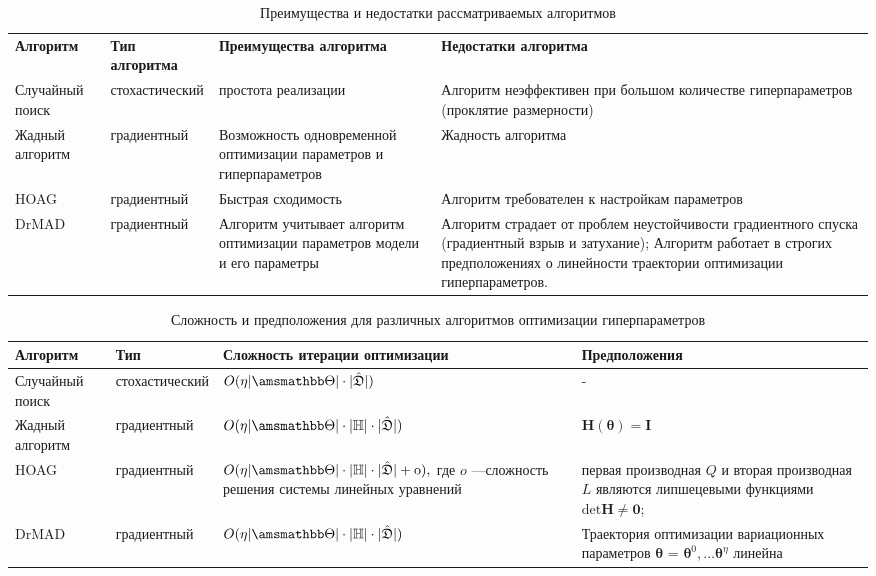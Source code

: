 \begin{table}[H]
\small

\begin{tabularx}{\textwidth}{|X|X|X|X|}
\hline
\bf Алгоритм & \bf Тип алгоритма & \bf Преимущества алгоритма & \bf Недостатки алгоритма  \\ 
Случайный поиск & стохастический & простота реализации& Алгоритм неэффективен при большом количестве гиперпараметров (проклятие размерности)  \\ \hline
Жадный алгоритм~\cite{greed_hyper} & градиентный & Возможность одновременной оптимизации параметров и гиперпараметров & Жадность алгоритма \\ \hline
HOAG~\cite{hyper_hoag} & градиентный & Быстрая сходимость & Алгоритм требователен к настройкам параметров \\ \hline 
DrMAD~\cite{hyper_mad} & градиентный & Алгоритм учитывает алгоритм оптимизации параметров модели и его параметры & Алгоритм страдает от проблем неустойчивости градиентного спуска (градиентный взрыв и затухание); Алгоритм работает в строгих предположениях о линейности траектории оптимизации гиперпараметров.\\ \hline
\end{tabularx}

\caption{Преимущества и недостатки рассматриваемых алгоритмов}
\label{table:algo_descr}

\end{table}


\begin{table}[H]
\small

\begin{tabularx}{\textwidth}{|X|X|X|X|}
\hline
\bf Алгоритм & \bf Тип & \bf Сложность итерации оптимизации & \bf Предположения \\ 
\hline
Случайный поиск & стохастический & $O(\eta |\Tetab|\cdot |\hat{\mathfrak{D}}|)$& -  \\ \hline
Жадный алгоритм~\cite{greed_hyper} & градиентный & $O(\eta |\Tetab|\cdot|\Hb|\cdot |\hat{\mathfrak{D}}|)$ & $\mathbf{H}(\boldsymbol{\theta}) = \mathbf{I}$  \\ \hline
HOAG~\cite{hyper_hoag} & градиентный & $O(\eta |\Tetab|\cdot|\Hb| \cdot |\hat{\mathfrak{D}}| + \text{o}),$ где $o$ ---сложность решения системы линейных уравнений& первая производная $Q$  и вторая производная $L$  являются липшецевыми функциями  $\text{det}\mathbf{H} \neq \mathbf{0}$;  \\ \hline
DrMAD~\cite{hyper_mad} & градиентный &$O(\eta |\Tetab|\cdot|\Hb| \cdot|\hat{\mathfrak{D}}|)$ & Траектория оптимизации вариационных параметров $\boldsymbol{\theta}$ = $\boldsymbol{\theta}^0, \dots \boldsymbol{\theta}^\eta$  линейна \\ \hline
\end{tabularx}

\caption{Сложность и предположения для различных алгоритмов оптимизации гиперпараметров}
\label{table:algo_descr2}

\end{table}






